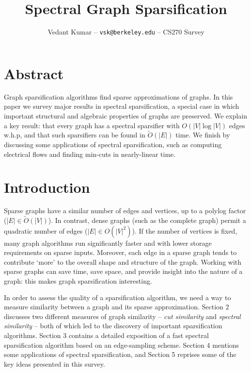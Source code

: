 \documentclass{article}
\title{Spectral Graph Sparsification}
\author{\small{Vedant Kumar -- \texttt{vsk@berkeley.edu} -- CS270 Survey}}
\begin{document}
\maketitle

\newcommand \cut[1]{\text{cut}_{#1}}
\newcommand \textlcsc[1]{\textsc{\MakeLowercase{#1}}}

\section*{Abstract}

Graph sparsification algorithms find sparse approximations of graphs. In
this paper we survey major results in spectral sparsification, a special
case in which important structural and algebraic properties of graphs are
preserved. We explain a key result: that every graph has a spectral
sparsifier with $O(|V|\log|V|)$ edges w.h.p, and that such sparsifiers can
be found in $\tilde{O}(|E|)$ time. We finish by discussing some applications
of spectral sparsification, such as computing electrical flows and finding
min-cuts in nearly-linear time.

\section{Introduction}

Sparse graphs have a similar number of edges and vertices, up to a polylog
factor ($|E| \in \tilde{O}(|V|)$). In contrast, dense graphs (such as the
complete graph) permit a quadratic number of edges ($|E| \in O(|V|^2)$). If
the number of vertices is fixed, many graph algorithms run significantly
faster and with lower storage requirements on sparse inputs.  Moreover, each
edge in a sparse graph tends to contribute `more' to the overall shape and
structure of the graph.  Working with sparse graphs can save time, save
space, and provide insight into the nature of a graph: this makes graph
sparsification interesting.

In order to assess the quality of a sparsification algorithm, we need a way
to measure similarity between a graph and its sparse approximation. Section
2 discusses two different measures of graph similarity --
\textit{cut similarity} and \textit{spectral similarity} -- both of which
led to the discovery of important sparsification algorithms. Section 3
contains a detailed exposition of a fast spectral sparsification algorithm
based on an edge-sampling scheme.  Section 4 mentions some applications of
spectral sparsification, and Section 5 reprises some of the key ideas
presented in this survey.
\end{document}
